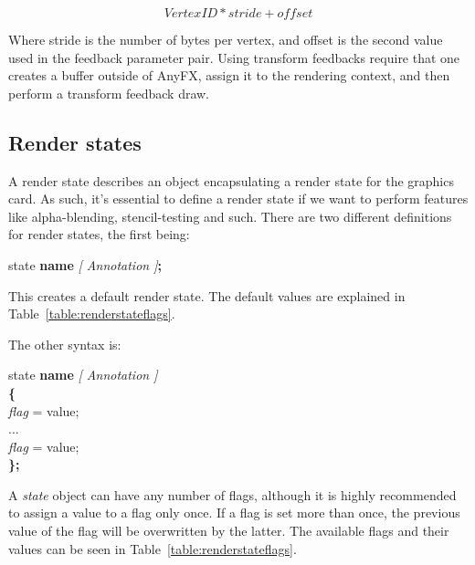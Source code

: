 \documentclass{article}
\newcommand{\SyntaxBox}[1]
{	
	\begin{center}
	\colorbox{orange!60}
	{
		\begin{minipage}{\linewidth}
		\hfill
		\begin{tabbing}
		#1
		\end{tabbing}
		\end{minipage}
	}
	\end{center}
}
\begin{document}
\[
Vertex ID * stride + offset
\]

Where stride is the number of bytes per vertex, and offset is the second value used in the feedback parameter pair. Using transform feedbacks require that one creates a buffer outside of AnyFX, assign it to the rendering context, and then perform a transform feedback draw. 

\subsection{Render states}
A render state describes an object encapsulating a render state for the graphics card. As such, it's essential to define a render state if we want to perform features like alpha-blending, stencil-testing and such. There are two different definitions for render states, the first being:

\begin{center}
\SyntaxBox
{
	state \textbf{name} \textit{[ Annotation ]}\textbf{;}
}
\end{center}

This creates a default render state. The default values are explained in Table~\ref{table:renderstateflags}. 

The other syntax is:

\SyntaxBox
{
		state \textbf{name} \textit{[ Annotation ]} \\
		\textbf{\{} \= \\
			\> \textit{flag} = value; \\
			\> ... \\
			\> \textit{flag} = value; \\
		\textbf{\};}
}

A \textit{state} object can have any number of flags, although it is highly recommended to assign a value to a flag only once. If a flag is set more than once, the previous value of the flag will be overwritten by the latter. The available flags and their values can be seen in Table~\ref{table:renderstateflags}.
\end{document}

